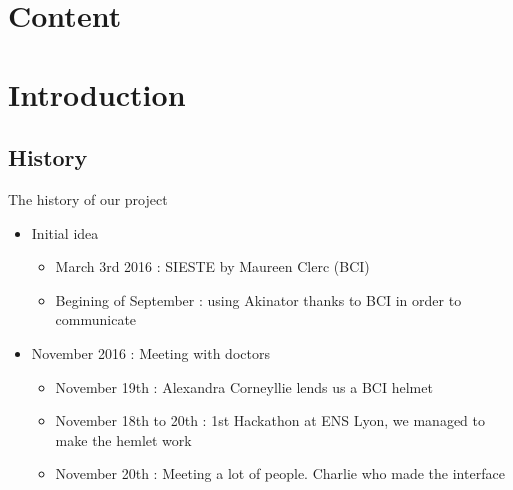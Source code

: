 \documentclass[graphics]{beamer}
\begin{document}
\section*{Content}
\begin{frame}
	\tableofcontents
\end{frame}

\section{Introduction}
\subsection{History}

\begin{frame}{The history of our project}
	\begin{itemize}
		\item Initial idea
		\begin{itemize}
			\item March 3rd 2016 : SIESTE by Maureen Clerc (BCI)
			\item Begining of September : using Akinator thanks to BCI in order to communicate
		\end{itemize}
		\pause
		\item November 2016 : Meeting with doctors
		\begin{itemize}
			\item November 19th : Alexandra Corneyllie lends us a BCI helmet
			\item November 18th to 20th : 1st Hackathon at ENS Lyon, we managed to make the hemlet work
			\item November 20th : Meeting a lot of people. Charlie who made the interface
		\end{itemize}
	\end{itemize}
\end{frame}
\end{document}
